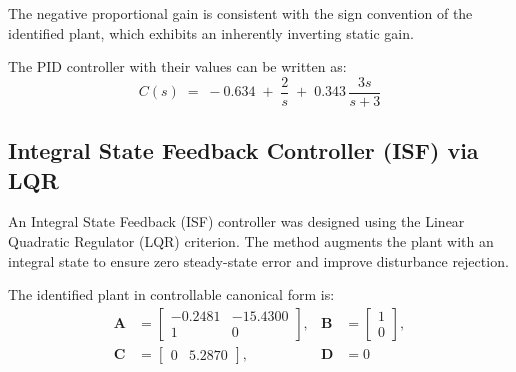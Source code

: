 \documentclass[conference]{IEEEtran}
\begin{document}
\noindent The negative proportional gain is consistent with the sign convention of the identified plant, which exhibits an inherently inverting static gain.

The PID controller with their values can be written as:
\begin{equation}
  C(s) \;=\; -0.634 \;+\; \frac{2}{s} \;+\; 0.343\,\frac{3s}{s + 3}
  \label{eq:pid_values}
\end{equation}


\subsection{Integral State Feedback Controller (ISF) via LQR}
\label{sec:isf_lqr}

An Integral State Feedback (ISF) controller was designed using the Linear Quadratic Regulator (LQR) criterion. The method augments the plant with an integral state to ensure zero steady-state error and improve disturbance rejection.

The identified plant in controllable canonical form is:
\begin{equation}
\begin{aligned}
\mathbf{A} &= \begin{bmatrix} -0.2481 & -15.4300 \\ 1 & 0 \end{bmatrix}, 
& \mathbf{B} &= \begin{bmatrix} 1 \\ 0 \end{bmatrix}, \\
\mathbf{C} &= \begin{bmatrix} 0 & 5.2870 \end{bmatrix}, 
& \mathbf{D} &= 0
\end{aligned}
\end{equation}
\end{document}
